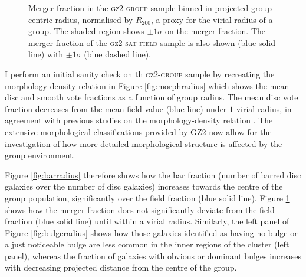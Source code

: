 \begin{figure}
\caption{Merger fraction in the \textsc{gz2-group} sample binned in projected group centric radius, normalised by $R_{200}$, a proxy for the virial radius of a group. The shaded region shows $\pm1\sigma$ on the merger fraction. The merger fraction of the \textsc{gz2-sat-field} sample is also shown (blue solid line) with $\pm1\sigma$ (blue dashed line).}
\label{fig:mergerradius}
\end{figure}


I perform an initial sanity check on th \textsc{gz2-group} sample by recreating the morphology-density relation \citep{dressler80} in Figure \ref{fig:morphradius} which shows the mean disc and smooth vote fractions as a function of group radius. The mean disc vote fraction decreases from the mean field value (blue line) under $1$ virial radius, in agreement with previous studies on the morphology-density relation \citep{dressler80, smail97, poggianti99, postman05, Bamford09}. The extensive morphological classifications provided by GZ2 now allow for the investigation of how more detailed morphological structure is affected by the group environment.  

Figure \ref{fig:barradius} therefore  shows how the bar fraction (number of barred disc galaxies over the number of disc galaxies) increases towards the centre of the group population, significantly over the field fraction (blue solid line). Figure \ref{fig:mergerradius} shows how the merger fraction does not significantly deviate from the field fraction (blue solid line) until within a virial radius. Similarly, the left panel of Figure \ref{fig:bulgeradius} shows how those galaxies identified as having no bulge or a just noticeable bulge are less common in the inner regions of the cluster (left panel), whereas the fraction of galaxies with obvious or dominant bulges increases with decreasing projected distance from the centre of the group.

